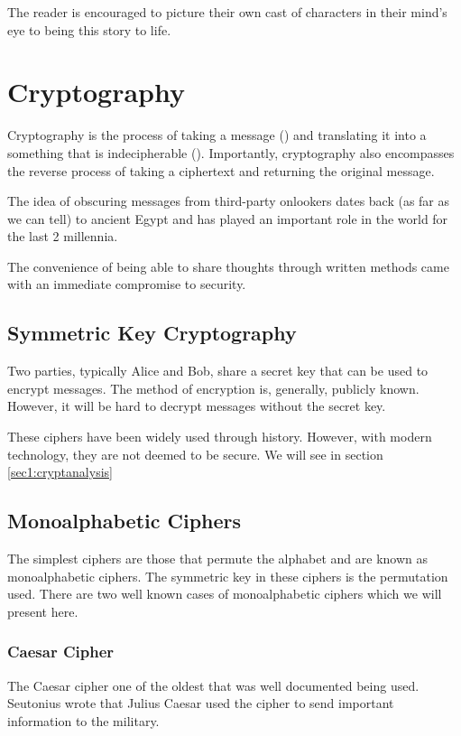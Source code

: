 The reader is encouraged to picture their own cast of characters in their mind's eye to being this story to life.

\section{Cryptography}
\label{sec1:crypto}

Cryptography is the process of taking a message () and translating it into a something that is indecipherable (). Importantly, cryptography also encompasses the reverse process of taking a ciphertext and returning the original message. 

The idea of obscuring messages from third-party onlookers dates back (as far as we can tell) to ancient Egypt and has played an important role in the world for the last 2 millennia. 

The convenience of being able to share thoughts through written methods came with an immediate compromise to security.

\subsection{Symmetric Key Cryptography}

Two parties, typically Alice and Bob, share a secret key that can be used to encrypt messages. The method of encryption is, generally, publicly known. However, it will be hard to decrypt messages without the secret key.

These ciphers have been widely used through history. However, with modern technology, they are not deemed to be secure. We will see in section \ref{sec1:cryptanalysis}

\subsection{Monoalphabetic Ciphers}

The simplest ciphers are those that permute the alphabet and are known as {\color{bristol-red} monoalphabetic ciphers}. The symmetric key in these 	ciphers is the permutation used. There are two well known cases of monoalphabetic ciphers which we will present here. 

\subsubsection*{Caesar Cipher}

The Caesar cipher one of the oldest that was well documented being used. Seutonius wrote that Julius Caesar used the cipher to send important information to the military. 

